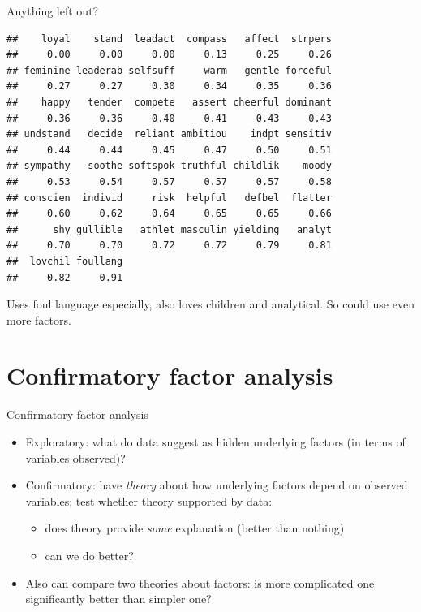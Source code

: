 \begin{frame}[fragile]{Anything left out?}

  {\scriptsize
\begin{knitrout}
\color{fgcolor}\begin{kframe}
\begin{alltt}
\hlkwb{=}\hlopt{$}\hlstd{)}
\end{alltt}
\begin{verbatim}
##    loyal    stand  leadact  compass   affect  strpers 
##     0.00     0.00     0.00     0.13     0.25     0.26 
## feminine leaderab selfsuff     warm   gentle forceful 
##     0.27     0.27     0.30     0.34     0.35     0.36 
##    happy   tender  compete   assert cheerful dominant 
##     0.36     0.36     0.40     0.41     0.43     0.43 
## undstand   decide  reliant ambitiou    indpt sensitiv 
##     0.44     0.44     0.45     0.47     0.50     0.51 
## sympathy   soothe softspok truthful childlik    moody 
##     0.53     0.54     0.57     0.57     0.57     0.58 
## conscien  individ     risk  helpful   defbel  flatter 
##     0.60     0.62     0.64     0.65     0.65     0.66 
##      shy gullible   athlet masculin yielding   analyt 
##     0.70     0.70     0.72     0.72     0.79     0.81 
##  lovchil foullang 
##     0.82     0.91
\end{verbatim}
\end{kframe}
\end{knitrout}
}

Uses foul language especially, also loves children and analytical. So
could use even more factors.
  
\end{frame}




\section{Confirmatory factor analysis}
\frame{\sectionpage}


\begin{frame}[fragile]{Confirmatory factor analysis}

  \begin{itemize}
  \item Exploratory: what do data suggest as hidden underlying factors (in terms of variables observed)?
  \item Confirmatory: have {\em theory} about how underlying factors depend on observed variables; test whether theory supported by data:
    \begin{itemize}
    \item does theory provide {\em some} explanation (better than nothing)
    \item can we do better?
    \end{itemize}
  \item Also can compare two theories about factors: is more complicated one significantly better than simpler one?
  \end{itemize}
  
\end{frame}

